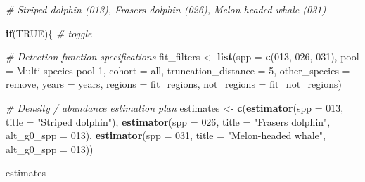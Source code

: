 \documentclass[
]{book}
\newenvironment{Shaded}{\begin{snugshade}}{\end{snugshade}}
\newcommand{\AttributeTok}[1]{\textcolor[rgb]{0.13,0.29,0.53}{#1}}
\newcommand{\CommentTok}[1]{\textcolor[rgb]{0.56,0.35,0.01}{\textit{#1}}}
\newcommand{\ConstantTok}[1]{\textcolor[rgb]{0.56,0.35,0.01}{#1}}
\newcommand{\ControlFlowTok}[1]{\textcolor[rgb]{0.13,0.29,0.53}{\textbf{#1}}}
\newcommand{\DecValTok}[1]{\textcolor[rgb]{0.00,0.00,0.81}{#1}}
\newcommand{\FunctionTok}[1]{\textcolor[rgb]{0.13,0.29,0.53}{\textbf{#1}}}
\newcommand{\NormalTok}[1]{#1}
\newcommand{\OtherTok}[1]{\textcolor[rgb]{0.56,0.35,0.01}{#1}}
\newcommand{\StringTok}[1]{\textcolor[rgb]{0.31,0.60,0.02}{#1}}
\begin{document}
\begin{Shaded}
\begin{Highlighting}[]
\CommentTok{\# Striped dolphin (013), Fraser\textquotesingle{}s dolphin (026), Melon{-}headed whale (031)}

\ControlFlowTok{if}\NormalTok{(}\ConstantTok{TRUE}\NormalTok{)\{ }\CommentTok{\# toggle}

  \CommentTok{\# Detection function specifications}
\NormalTok{  fit\_filters }\OtherTok{\textless{}{-}}
    \FunctionTok{list}\NormalTok{(}\AttributeTok{spp =} \FunctionTok{c}\NormalTok{(}\StringTok{\textquotesingle{}013\textquotesingle{}}\NormalTok{, }\StringTok{\textquotesingle{}026\textquotesingle{}}\NormalTok{, }\StringTok{\textquotesingle{}031\textquotesingle{}}\NormalTok{),}
         \AttributeTok{pool =} \StringTok{\textquotesingle{}Multi{-}species pool 1\textquotesingle{}}\NormalTok{,}
         \AttributeTok{cohort =} \StringTok{\textquotesingle{}all\textquotesingle{}}\NormalTok{,}
         \AttributeTok{truncation\_distance =} \DecValTok{5}\NormalTok{,}
         \AttributeTok{other\_species =} \StringTok{\textquotesingle{}remove\textquotesingle{}}\NormalTok{,}
         \AttributeTok{years =}\NormalTok{ years,}
         \AttributeTok{regions =}\NormalTok{ fit\_regions,}
         \AttributeTok{not\_regions =}\NormalTok{ fit\_not\_regions)}

  \CommentTok{\# Density / abundance estimation plan}
\NormalTok{  estimates }\OtherTok{\textless{}{-}}
    \FunctionTok{c}\NormalTok{(}\FunctionTok{estimator}\NormalTok{(}\AttributeTok{spp =} \StringTok{\textquotesingle{}013\textquotesingle{}}\NormalTok{, }\AttributeTok{title =} \StringTok{"Striped dolphin"}\NormalTok{),}
      \FunctionTok{estimator}\NormalTok{(}\AttributeTok{spp =} \StringTok{\textquotesingle{}026\textquotesingle{}}\NormalTok{, }\AttributeTok{title =} \StringTok{"Fraser\textquotesingle{}s dolphin"}\NormalTok{, }\AttributeTok{alt\_g0\_spp =} \StringTok{\textquotesingle{}013\textquotesingle{}}\NormalTok{),}
      \FunctionTok{estimator}\NormalTok{(}\AttributeTok{spp =} \StringTok{\textquotesingle{}031\textquotesingle{}}\NormalTok{, }\AttributeTok{title =} \StringTok{"Melon{-}headed whale"}\NormalTok{, }\AttributeTok{alt\_g0\_spp =} \StringTok{\textquotesingle{}013\textquotesingle{}}\NormalTok{))}
  
\NormalTok{  estimates}
  

\end{Highlighting}
\end{Shaded}
\end{document}

